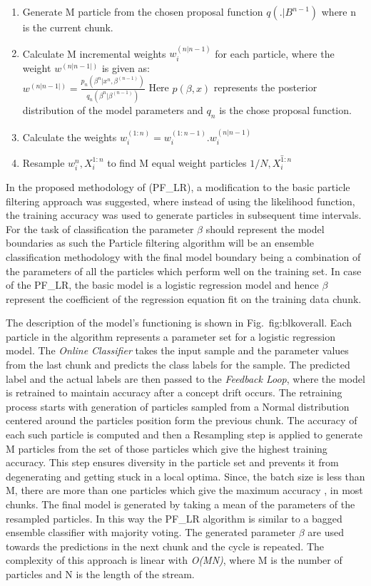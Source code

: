\documentclass[conference]{IEEEtran}
\begin{document}
\begin{enumerate}
 \item  Generate M particle from the chosen proposal function $q(.|B^{n-1})$ where n is the current chunk. 
 \item Calculate M incremental weights $w_{i}^{(n|n-1)}$ for each particle, where the weight $w^{(n|n-1|)}$ is given as:\\
 $w^{(n|n-1|)}= \frac{p_n (\beta^n | x^n , \beta^{(n-1)})}{q_n(\beta^n|\beta^(n-1))}$ 
 Here $p(\beta,x)$ represents the posterior distribution of the model parameters and $q_n$ is the chose proposal function.
 \item Calculate the weights $w_{i}^{(1:n)} = w_{i}^{(1:n-1)} . w_{i}^{(n|n-1)}$
 \item Resample ${w_{i}^{n} , X_{i}^{1:n} }$ to find M equal weight particles ${1/N, \bar{X_i ^{1:n}}}$ 
\end{enumerate}

In the proposed methodology of \cite{pflr}(PF\_LR), a modification to the basic particle filtering approach was suggested, where instead of using the likelihood function, the training accuracy was used to generate particles in subsequent time intervals. For the task of classification the parameter $\beta$ should represent the model boundaries as such the Particle filtering algorithm will be an ensemble classification methodology with the final model boundary being a combination of the parameters of all the particles which perform well on the training set. In case of the PF\_LR, the basic model is a logistic regression model and hence $\beta$ represent the coefficient of the regression equation fit on the training data chunk. 


The description of the model's functioning is shown in Fig.~{fig:blkoverall}. Each particle in the algorithm represents a parameter set for a logistic regression model.  The \textit{Online Classifier} takes the input sample and the parameter values from the last chunk and predicts the class labels for the sample. The predicted label and the actual labels are then passed to the \textit{Feedback Loop}, where the model is retrained to maintain accuracy after a concept drift occurs. The retraining process starts with generation of particles sampled from a Normal distribution centered around the particles position form the previous chunk. The accuracy of each such particle is computed and then a Resampling step is applied to generate M particles from the set of those particles which give the highest training accuracy. This step ensures diversity in the particle set and prevents it from degenerating and getting stuck in a local optima. Since, the batch size is less than M, there are more than one particles which give  the maximum accuracy , in most chunks. The final model is generated by taking a mean of the parameters of the resampled particles. In this way the PF\_LR algorithm is similar to a bagged ensemble classifier with majority voting. The generated parameter $\beta$ are used towards the predictions in the next chunk and the cycle is repeated. The complexity of this approach is linear with \textit{O(MN)}, where M is the number of particles and N is the length of the stream. 
\end{document}
